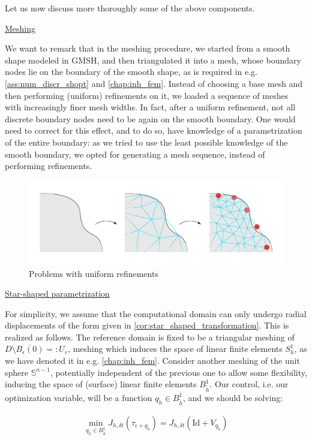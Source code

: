 \documentclass[english,a4paper,9pt,oneside]{scrbook}	%
\theoremstyle{break}
\theoremstyle{remark}
\newcommand{\mS}{\mathbb{S}^{n-1}}
\newcommand{\id}{\text{Id}}
\newcommand{\eps}{\epsilon}
\begin{document}
Let us now discuss more thoroughly some of the above components.

\underline{Meshing}

We want to remark that in the meshing procedure, we started from a smooth shape modeled in GMSH, and then triangulated it into a mesh, whose boundary nodes lie on the boundary of the smooth shape, as is required in e.g. \cref{ass:num_discr_shopt} and \cref{chap:inh_fem}. Instead of choosing a base mesh and then performing (uniform) refinements on it, we loaded a sequence of meshes with increasingly finer mesh widths. In fact, after a uniform refinement, not all discrete boundary nodes need to be again on the smooth boundary. One would need to correct for this effect, and to do so, have knowledge of a parametrization of the entire boundary: as we tried to use the least possible knowledge of the smooth boundary, we opted for generating a mesh sequence, instead of performing refinements.

\begin{figure}[H]
\centering
\includegraphics[width=0.75\columnwidth]{Images/UniformRefinement.pdf}
\caption{Problems with uniform refinements}\label{fig:uniform_refinement}
\end{figure}

\underline{Star-shaped parametrization}

For simplicity, we assume that the computational domain can only undergo radial displacements of the form given in \cref{cor:star_shaped_transformation}. This is realized as follows. The reference domain is fixed to be a triangular meshing of $D\setminus \overline{B_\epsilon(0)}=:U_r$, meshing which induces the space of linear finite elements $S^1_h$, as we have denoted it in e.g. \cref{chap:inh_fem}. Consider another meshing of the unit sphere $\mS$, potentially independent of the previous one to allow some flexibility, inducing the space of (surface) linear finite elements $B^1_{\tilde{h}}$. Our control, i.e. our optimization variable, will be a function $ q_{\tilde{h}} \in B^1_{\tilde{h}}$, and we should be solving:

\begin{align*}
	\min_{q_{\tilde{h}} \in B^1_{\tilde{h}}} J_{h,\delta t}(\tau_{\eps+q_{\tilde{h}}}) = J_{h,\delta t }(\id  + V_{q_{\tilde{h}}})
\end{align*}
\end{document}
